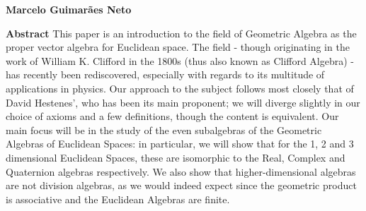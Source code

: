 \thispagestyle{plain}
\begin{center}
    \Large
    \textbf{\thtitle}
        
    \vspace{0.4cm}
    \large
	\thsubtitle

    \vspace{0.4cm}
    \textbf{Marcelo Guimarães Neto}
       
    \vspace{0.9cm}
    \textbf{Abstract}
	This paper is an introduction to the field of Geometric Algebra as the proper vector algebra for Euclidean space. The field - though originating in the work of William K. Clifford in the 1800s (thus also known as Clifford Algebra) - has recently been rediscovered, especially with regards to its multitude of applications in physics. Our approach to the subject follows most closely that of David Hestenes', who has been its main proponent; we will diverge slightly in our choice of axioms and a few definitions, though the content is equivalent. Our main focus will be in the study of the even subalgebras of the Geometric Algebras of Euclidean Spaces: in particular, we will show that for the 1, 2 and 3 dimensional Euclidean Spaces, these are isomorphic to the Real, Complex and Quaternion algebras respectively. We also show that higher-dimensional algebras are not division algebras, as we would indeed expect since the geometric product is associative and the Euclidean Algebras are finite.
\end{center}
